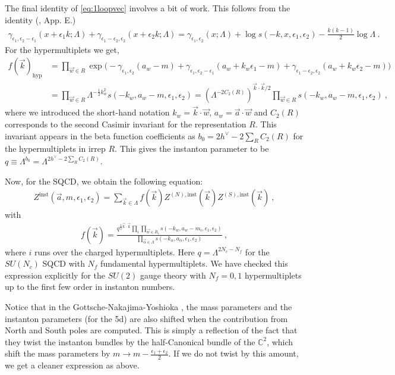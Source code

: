 \documentclass[letterpaper, 11pt]{article}
\newcommand{\nn}{\nonumber}
\def\IC{\mathbb{C}}
\def\a{\alpha}
\def\g{\gamma}
\def\e{\epsilon}
\def\half{\frac{1}{2}}
\begin{document}
The final identity of \eqref{eq:1loopvec} involves a bit of work. This follows from the identity (\cite{Nakajima:2003uh}, App. E.)
\begin{align}
 \g_{\e_1, \e_2-\e_1}(x+\e_1 k; \Lambda) + \g_{\e_1 - \e_2, \e_2}(x+\e_2k; \Lambda)
  = \g_{\e_1, \e_2}(x; \Lambda) + \log s(-k, x, \e_1, \e_2) - \frac{k(k-1)}{2} \log \Lambda \ . 
\end{align}
For the hypermultiplets we get, 
\begin{align}
f(\vec{k})_{\textrm{hyp}} &=  \prod_{\vec{w} \in R} \exp \Big( -\g_{\e_1, \e_2} (a_w - m) + \g_{\e_1, \e_2 - \e_1}(a_w + k_w \e_1 - m) +  \g_{\e_1 - \e_2, \e_2 }(a_w + k_w \e_2 - m)   \Big) \nn \\
&= \prod_{\vec{w} \in R} \Lambda^{-\half k_w^2} s(-{k}_w, {a}_w - m, \e_1, \e_2) 
= (\Lambda^{- 2 C_2(R)})^{\vec{k} \cdot \vec{k}/2 }\prod_{\vec{w} \in R}  s(-{k}_w, {a}_w - m, \e_1, \e_2) 
\ , 
\end{align}
where we introduced the short-hand notation $k_w = \vec{k}\cdot\vec{w}$, $a_w = \vec{a} \cdot \vec{w}$ and $C_2(R)$ corresponds to the second Casimir invariant for the representation $R$. This invariant appears in the beta function coefficients as $b_0 = 2h^\vee - 2 \sum_R C_2(R)$ for the hypermultiplets in irrep $R$.  This gives the instanton parameter to be $q\equiv \Lambda^{b_0} = \Lambda^{2h^\vee - 2 \sum_R C_2(R)}$. 

Now, for the SQCD, we obtain the following equation:
\begin{align}
  Z^{\textrm{inst}}(\vec{a}, m, \e_1, \e_2) = \sum_{\vec{k} \in \Lambda} f(\vec{k}) Z^{(N), \textrm{inst}}(\vec{k} ) Z^{(S), \textrm{inst}}(\vec{k}) \ , 
\end{align}
with
\begin{align}
 f(\vec{k}) =  \frac{\displaystyle q^{\half \vec{k} \cdot \vec{k}} \prod_{i} \prod_{\vec{w} \in R_i}  s(-k_w, a_w - m_i, \e_1, \e_2)}{\displaystyle \prod_{\vec{\a} \in \Lambda} s(-k_\a, a_\a, \e_1, \e_2)} \ , 
\end{align} 
where $i$ runs over the charged hypermultiplets. Here $q = \Lambda^{2N_c - N_f}$ for the $SU(N_c)$ SQCD with $N_f$ fundamental hypermultiplets. 
We have checked this expression explicitly for the $SU(2)$ gauge theory with $N_f=0, 1$ hypermultiplets up to the first few order in instanton numbers. 

Notice that in the Gottsche-Nakajima-Yoshioka \cite{Nakajima:2009qjc, Gottsche:2010ig}, the mass parameters and the instanton parameters (for the 5d) are also shifted when the contribution from North and South poles are computed. This is simply a reflection of the fact that they twist the instanton bundles by the half-Canonical bundle of the $\IC^2$, which shift the mass parameters by $m \to m - \frac{\e_1 + \e_2}{2}$. If we do not twist by this amount, we get a cleaner expression as above. 
\end{document}
